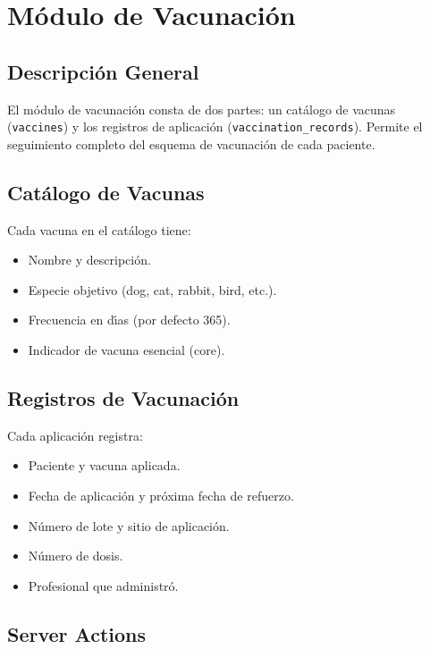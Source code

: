 \chapter{M\'odulo de Vacunaci\'on}

\section{Descripci\'on General}

El m\'odulo de vacunaci\'on consta de dos partes: un cat\'alogo de vacunas
(\texttt{vaccines}) y los registros de aplicaci\'on
(\texttt{vaccination\_records}). Permite el seguimiento completo del
esquema de vacunaci\'on de cada paciente.

\section{Cat\'alogo de Vacunas}

Cada vacuna en el cat\'alogo tiene:

\begin{itemize}[leftmargin=*]
    \item Nombre y descripci\'on.
    \item Especie objetivo (dog, cat, rabbit, bird, etc.).
    \item Frecuencia en d\'{\i}as (por defecto 365).
    \item Indicador de vacuna esencial (core).
\end{itemize}

\section{Registros de Vacunaci\'on}

Cada aplicaci\'on registra:

\begin{itemize}[leftmargin=*]
    \item Paciente y vacuna aplicada.
    \item Fecha de aplicaci\'on y pr\'oxima fecha de refuerzo.
    \item N\'umero de lote y sitio de aplicaci\'on.
    \item N\'umero de dosis.
    \item Profesional que administr\'o.
\end{itemize}

\section{Server Actions}

